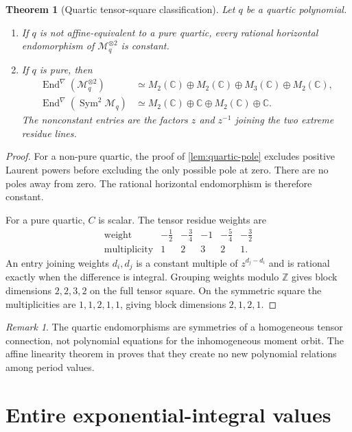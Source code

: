 \documentclass[11pt]{article}
\numberwithin{equation}{section}
\newtheorem{theorem}{Theorem}[section]
\theoremstyle{definition}
\theoremstyle{remark}
\newtheorem{remark}[remark]{Remark}
\newcommand{\C}{\mathbb C}
\newcommand{\Sym}{\operatorname{Sym}}
\newcommand{\End}{\operatorname{End}}
\newcommand{\Mcal}{\mathcal M}
\begin{document}
\begin{theorem}[Quartic tensor-square classification]
\label{thm:quartic-classification}
Let $q$ be a quartic polynomial.
\begin{enumerate}[label=\textup{(\roman*)},leftmargin=2.4em]
\item If $q$ is not affine-equivalent to a pure quartic, every rational
horizontal endomorphism of $\Mcal_q^{\otimes2}$ is constant.
\item If $q$ is pure, then
\begin{align*}
  \End^\nabla(\Mcal_q^{\otimes2})
  &\simeq M_2(\C)\oplus M_2(\C)\oplus M_3(\C)\oplus M_2(\C),\\
  \End^\nabla(\Sym^2\Mcal_q)
  &\simeq M_2(\C)\oplus\C\oplus M_2(\C)\oplus\C.
\end{align*}
The nonconstant entries are the factors $z$ and $z^{-1}$ joining the two
extreme residue lines.
\end{enumerate}
\end{theorem}

\begin{proof}
For a non-pure quartic, the proof of \cref{lem:quartic-pole} excludes
positive Laurent powers before excluding the only possible pole at zero.
There are no poles away from zero.  The rational horizontal endomorphism
is therefore constant.

For a pure quartic, $C$ is scalar.  The tensor residue weights are
\[
\begin{array}{c|ccccc}
\text{weight}&-\frac12&-\frac34&-1&-\frac54&-\frac32\\ \hline
\text{multiplicity}&1&2&3&2&1.
\end{array}
\]
An entry joining weights $d_i,d_j$ is a constant multiple of
$z^{d_j-d_i}$ and is rational exactly when the difference is integral.
Grouping weights modulo $\mathbb Z$ gives block dimensions $2,2,3,2$ on the
full tensor square.  On the symmetric square the multiplicities are
$1,1,2,1,1$, giving block dimensions $2,1,2,1$.
\end{proof}

\begin{remark}
The quartic endomorphisms are symmetries of a homogeneous tensor connection,
not polynomial equations for the inhomogeneous moment orbit.  The affine
linearity theorem in \cite{LongPolynomialKZ} proves that they create no new
polynomial relations among period values.
\end{remark}

\section{Entire exponential-integral values}
\label{sec:Ein}
\end{document}
